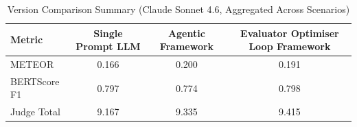\begin{table}[htbp]
\centering
\caption{Version Comparison Summary (Claude Sonnet 4.6, Aggregated Across Scenarios)}
\label{tab:version_summary_claude}
\begin{tabular}{lccc}
\toprule
Metric & Single Prompt LLM & Agentic Framework & Evaluator Optimiser Loop Framework \\
\midrule
METEOR & 0.166 & 0.200 & 0.191 \\
BERTScore F1 & 0.797 & 0.774 & 0.798 \\
Judge Total & 9.167 & 9.335 & 9.415 \\
\bottomrule
\end{tabular}
\end{table}